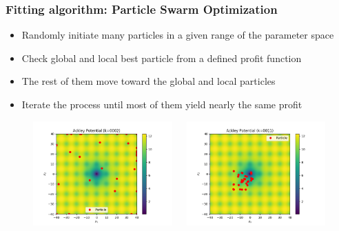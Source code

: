 \documentclass{beamer}
\begin{document}
\begin{frame}\frametitle{Fitting algorithm: Particle Swarm Optimization}
\begin{itemize}
  \item Randomly initiate many particles in a given range of the parameter space
  \item Check global and local best particle from a defined profit function
  \item The rest of them move toward the global and local particles
  \item Iterate the process until most of them yield nearly the same profit
\end{itemize}
\begin{figure}
\begin{columns}
  \begin{column}{0.34\textwidth}
    \includegraphics[width=\columnwidth]{figure/particle_swarm0002}
  \end{column}
  \begin{column}{0.34\textwidth}
  \includegraphics[width=\columnwidth]{figure/particle_swarm0011}

\end{column}
\end{columns}
\end{figure}
\end{frame}
\end{document}
